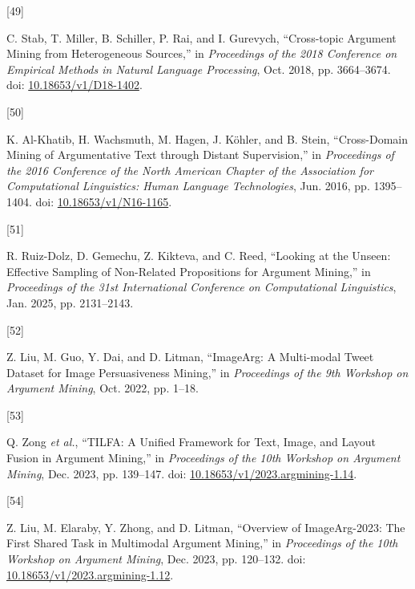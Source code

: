 \documentclass[twocolumn,twoside]{article}
\newlength{\cslhangindent}
\newlength{\csllabelwidth}
\newenvironment{CSLReferences}[2] %
 {\begin{list}{}{%
  \setlength{\itemindent}{0pt}
  \setlength{\leftmargin}{0pt}
  \setlength{\parsep}{0pt}
  \ifodd #1
   \setlength{\leftmargin}{\cslhangindent}
   \setlength{\itemindent}{-1\cslhangindent}
  \fi
  \setlength{\itemsep}{#2\baselineskip}}}
 {\end{list}}
\newcommand{\CSLLeftMargin}[1]{\parbox[t]{\csllabelwidth}{\strut#1\strut}}
\newcommand{\CSLRightInline}[1]{\parbox[t]{\linewidth - \csllabelwidth}{\strut#1\strut}}
\begin{document}
\begin{CSLReferences}{0}{0}
\CSLLeftMargin{{[}49{]} }%
\CSLRightInline{C. Stab, T. Miller, B. Schiller, P. Rai, and I.
Gurevych, {``Cross-topic {Argument Mining} from {Heterogeneous
Sources},''} in \emph{Proceedings of the 2018 {Conference} on {Empirical
Methods} in {Natural Language Processing}}, Oct. 2018, pp. 3664--3674.
doi: \href{https://doi.org/10.18653/v1/D18-1402}{10.18653/v1/D18-1402}.}

\CSLLeftMargin{{[}50{]} }%
\CSLRightInline{K. Al-Khatib, H. Wachsmuth, M. Hagen, J. Köhler, and B.
Stein, {``Cross-{Domain Mining} of {Argumentative Text} through {Distant
Supervision},''} in \emph{Proceedings of the 2016 {Conference} of the
{North American Chapter} of the {Association} for {Computational
Linguistics}: {Human Language Technologies}}, Jun. 2016, pp. 1395--1404.
doi: \href{https://doi.org/10.18653/v1/N16-1165}{10.18653/v1/N16-1165}.}

\CSLLeftMargin{{[}51{]} }%
\CSLRightInline{R. Ruiz-Dolz, D. Gemechu, Z. Kikteva, and C. Reed,
{``Looking at the {Unseen}: {Effective Sampling} of {Non-Related
Propositions} for {Argument Mining},''} in \emph{Proceedings of the 31st
{International Conference} on {Computational Linguistics}}, Jan. 2025,
pp. 2131--2143.}

\CSLLeftMargin{{[}52{]} }%
\CSLRightInline{Z. Liu, M. Guo, Y. Dai, and D. Litman, {``{ImageArg}: {A
Multi-modal Tweet Dataset} for {Image Persuasiveness Mining},''} in
\emph{Proceedings of the 9th {Workshop} on {Argument Mining}}, Oct.
2022, pp. 1--18.}

\CSLLeftMargin{{[}53{]} }%
\CSLRightInline{Q. Zong \emph{et al.}, {``{TILFA}: {A Unified Framework}
for {Text}, {Image}, and {Layout Fusion} in {Argument Mining},''} in
\emph{Proceedings of the 10th {Workshop} on {Argument Mining}}, Dec.
2023, pp. 139--147. doi:
\href{https://doi.org/10.18653/v1/2023.argmining-1.14}{10.18653/v1/2023.argmining-1.14}.}

\CSLLeftMargin{{[}54{]} }%
\CSLRightInline{Z. Liu, M. Elaraby, Y. Zhong, and D. Litman, {``Overview
of {ImageArg-2023}: {The First Shared Task} in {Multimodal Argument
Mining},''} in \emph{Proceedings of the 10th {Workshop} on {Argument
Mining}}, Dec. 2023, pp. 120--132. doi:
\href{https://doi.org/10.18653/v1/2023.argmining-1.12}{10.18653/v1/2023.argmining-1.12}.}


\end{CSLReferences}
\end{document}
